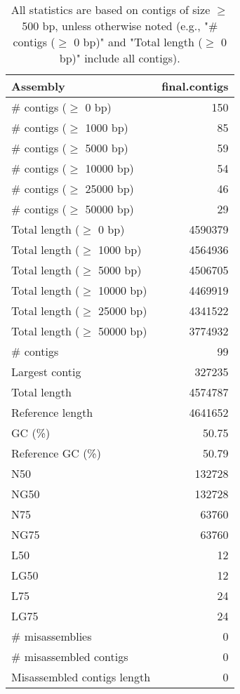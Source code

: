 \documentclass[12pt,a4paper]{article}
\begin{document}
\begin{table}[ht]
\begin{center}
\caption{All statistics are based on contigs of size $\geq$ 500 bp, unless otherwise noted (e.g., "\# contigs ($\geq$ 0 bp)" and "Total length ($\geq$ 0 bp)" include all contigs).}
\begin{tabular}{|l*{1}{|r}|}
\hline
Assembly & final.contigs \\ \hline
\# contigs ($\geq$ 0 bp) & 150 \\ \hline
\# contigs ($\geq$ 1000 bp) & 85 \\ \hline
\# contigs ($\geq$ 5000 bp) & 59 \\ \hline
\# contigs ($\geq$ 10000 bp) & 54 \\ \hline
\# contigs ($\geq$ 25000 bp) & 46 \\ \hline
\# contigs ($\geq$ 50000 bp) & 29 \\ \hline
Total length ($\geq$ 0 bp) & 4590379 \\ \hline
Total length ($\geq$ 1000 bp) & 4564936 \\ \hline
Total length ($\geq$ 5000 bp) & 4506705 \\ \hline
Total length ($\geq$ 10000 bp) & 4469919 \\ \hline
Total length ($\geq$ 25000 bp) & 4341522 \\ \hline
Total length ($\geq$ 50000 bp) & 3774932 \\ \hline
\# contigs & 99 \\ \hline
Largest contig & 327235 \\ \hline
Total length & 4574787 \\ \hline
Reference length & 4641652 \\ \hline
GC (\%) & 50.75 \\ \hline
Reference GC (\%) & 50.79 \\ \hline
N50 & 132728 \\ \hline
NG50 & 132728 \\ \hline
N75 & 63760 \\ \hline
NG75 & 63760 \\ \hline
L50 & 12 \\ \hline
LG50 & 12 \\ \hline
L75 & 24 \\ \hline
LG75 & 24 \\ \hline
\# misassemblies & 0 \\ \hline
\# misassembled contigs & 0 \\ \hline
Misassembled contigs length & 0 \\ \hline

\end{tabular}
\end{center}
\end{table}
\end{document}
